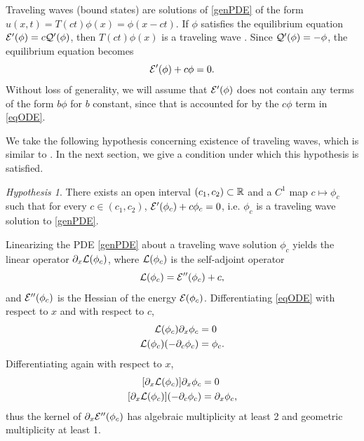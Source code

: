 \documentclass[10pt,reqno]{amsart}
\theoremstyle{plain}
\theoremstyle{definition}
\theoremstyle{remark}
\newtheorem{hypothesis}[theorem]{Hypothesis}
\numberwithin{theorem}{section}
\numberwithin{equation}{section}
\begin{document}
Traveling waves (bound states) are solutions of \cref{genPDE} of the form $u(x, t) = T(ct)\phi(x) = \phi(x - ct)$. If $\phi$ satisfies the equilibrium equation $\mathcal{E}'(\phi) = c \mathcal{Q}'(\phi)$, then $T(ct)\phi(x)$ is a traveling wave \cite{Grillakis1987}. Since $\mathcal{Q}'(\phi) = -\phi$, the equilibrium equation becomes
\begin{equation}\label{eqODE}
\mathcal{E}'(\phi) + c \phi = 0.
\end{equation}
Without loss of generality, we will assume that $\mathcal{E}'(\phi)$ does not contain any terms of the form $b\phi$ for $b$ constant, since that is accounted for by the $c \phi$ term in \cref{eqODE}.

We take the following hypothesis concerning existence of traveling waves, which is similar to \cite[Assumption 2]{Grillakis1987}. In the next section, we give a condition under which this hypothesis is satisfied. 
\begin{hypothesis}\label{hyp:cinterval}
There exists an open interval $(c_1, c_2) \subset \mathbb{R}$ and a $C^1$ map $c \mapsto \phi_c$ such that for every $c \in (c_1, c_2)$, $\mathcal{E}'(\phi_c) + c \phi_c = 0$, i.e. $\phi_c$ is a traveling wave solution to \cref{genPDE}.
\end{hypothesis}

Linearizing the PDE \cref{genPDE} about a traveling wave solution $\phi_c$ yields the linear operator $\partial_x \mathcal{L}(\phi_c)$, where $\mathcal{L}(\phi_c)$ is the self-adjoint operator
\begin{equation}\label{PDElinearization}
\mathcal{L}(\phi_c) = \mathcal{E}''(\phi_c) + c,
\end{equation}
and $\mathcal{E}''(\phi_c)$ is the Hessian of the energy $\mathcal{E}(\phi_c)$. Differentiating \cref{eqODE} with respect to $x$ and with respect to $c$,
\begin{equation}\label{Lkernel}
\begin{aligned}
\mathcal{L}(\phi_c) \partial_x \phi_c &= 0 \\
\mathcal{L}(\phi_c) (-\partial_c \phi_c)& = \phi_c.
\end{aligned}
\end{equation}
Differentiating again with respect to $x$,
\begin{equation}\label{Ekernel}
\begin{aligned}
[\partial_x \calL(\phi_c)] \partial_x \phi_c &= 0 \\
[\partial_x \calL(\phi_c)](-\partial_c \phi_c) &= \partial_x \phi_c,
\end{aligned}
\end{equation}
thus the kernel of $\partial_x \mathcal{E}''(\phi_c)$ has algebraic multiplicity at least 2 and geometric multiplicity at least 1.
\end{document}

